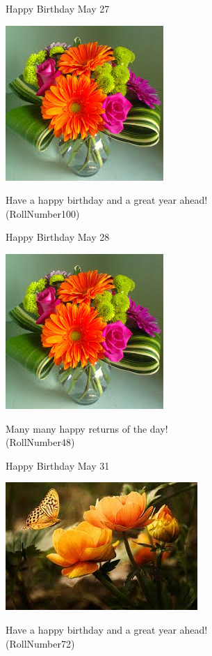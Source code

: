 \documentclass[table, landscape]{beamer}
\begin{document}
\begin{frame}{\color{red}Happy Birthday }
{May 27}
\begin{center}
\includegraphics[height=0.5\textheight]{flowers/f8.jpeg}

Have a happy birthday and a great year ahead! \\ \vspace{0.5cm}{\Large name93} (RollNumber100)
\end{center}
\end{frame}
\begin{frame}{\color{red}Happy Birthday }
{May 28}
\begin{center}
\includegraphics[height=0.5\textheight]{flowers/f8.jpeg}

Many many happy returns of the day! \\ \vspace{0.5cm}{\Large name41} (RollNumber48)
\end{center}
\end{frame}
\begin{frame}{\color{blue}Happy Birthday }
{May 31}
\begin{center}
\includegraphics[height=0.5\textheight]{flowers/f7.jpeg}

Have a happy birthday and a great year ahead! \\ \vspace{0.5cm}{\Large name65} (RollNumber72)
\end{center}
\end{frame}
\end{document}

